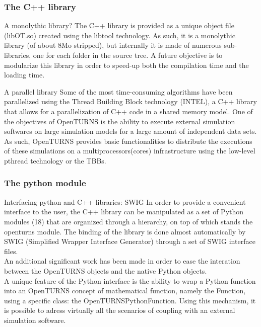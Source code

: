 \documentclass[8pt]{beamer}
\begin{document}
\begin{frame}
  \frametitle{The C++ library}
  \begin{block}{A monolythic library?}
    The C++ library is provided as a unique object file (libOT.so) created using the libtool technology. As such, it is a monolythic library (of about 8Mo stripped), but internally it is made of numerous sub-libraries, one for each folder in the source tree. A future objective is to modularize this library in order to speed-up both the compilation time and the loading time.
  \end{block}
  \begin{block}{A parallel library}
    Some of the most time-consuming algorithms have been parallelized using the Thread Building Block technology (INTEL), a C++ library that allows for a parallelization of C++ code in a shared memory model. One of the objectives of OpenTURNS is the ability to execute external simulation softwares on large simulation models for a large amount of independent data sets. As such, OpenTURNS provides basic functionalities to distribute the executions of these simulations on a multiprocessors(cores) infrastructure using the low-level pthread technology or the TBBs.
  \end{block}
\end{frame}
\begin{frame}
  \frametitle{The python module}
  \begin{block}{Interfacing python and C++ libraries: SWIG}
    In order to provide a convenient interface to the user, the C++ library can be manipulated as a set of Python modules (18) that are organized through a hierarchy, on top of which stands the openturns module. The binding of the library is done almost automatically by SWIG (Simplified Wrapper Interface Generator) through a set of SWIG interface files.\\
    An additional significant work has been made in order to ease the interation between the OpenTURNS objects and the native Python objects.\\
    A unique feature of the Python interface is the ability to wrap a Python function into an OpenTURNS concept of mathematical function, namely the Function, using a specific class: the OpenTURNSPythonFunction. Using this mechanism, it is possible to adress virtually all the scenarios of coupling with an external simulation software.
  \end{block}
\end{frame}
\end{document}
